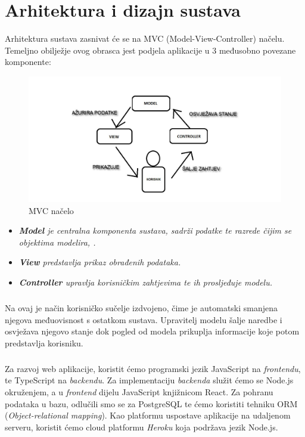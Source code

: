 \chapter{Arhitektura i dizajn sustava}
		
		 Arhitektura sustava zasnivat će se na MVC (Model-View-Controller)
		načelu. Temeljno obilježje ovog obrasca jest podjela aplikacije u 3 međusobno povezane komponente:
		
		\begin{figure}[h]
			\includegraphics[scale=0.5]{images/mvc.jpeg}
			\caption{MVC načelo}
			\label{fig:MVC slika} 
		\end{figure}
		\begin{itemize}
			\item 	\textit{ \textbf{Model} je centralna komponenta sustava, sadrži podatke te razrede čijim se objektima modelira, .}
			\item 	\textit{\textbf{View} predstavlja prikaz obrađenih podataka.}
			\item 	\textit {\textbf{Controller} upravlja korisničkim zahtjevima te ih prosljeđuje modelu.}
		\end{itemize}
		\paragraph{}
		
		Na ovaj je način korisničko sučelje izdvojeno, čime je automatski smanjena njegova međuovisnost s ostatkom sustava. Upravitelj modelu šalje naredbe i osvježava njegovo stanje dok pogled od modela prikuplja informacije koje potom predstavlja korisniku.  
		
		\paragraph{}
		
		Za razvoj web aplikacije, koristit ćemo programski jezik JavaScript na \textit{frontendu}, te TypeScript na \textit{backendu}. Za implementaciju \textit{backenda} služit ćemo se Node.js okruženjem, a u \textit{frontend} dijelu JavaScript knjižnicom React. Za pohranu podataka u bazu, odlučili smo se za PostgreSQL te ćemo koristiti tehniku ORM (\textit{Object-relational mapping}).
		Kao platformu uspostave aplikacije na udaljenom serveru, koristit ćemo cloud platformu \textit{Heroku} koja podržava jezik Node.js.
		
